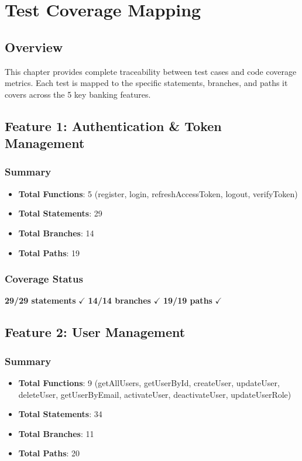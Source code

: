 \chapter{Test Coverage Mapping}

\section{Overview}
This chapter provides complete traceability between test cases and code coverage metrics. Each test is mapped to the specific statements, branches, and paths it covers across the 5 key banking features.

\section{Feature 1: Authentication \& Token Management}

\subsection{Summary}
\begin{itemize}
    \item \textbf{Total Functions}: 5 (register, login, refreshAccessToken, logout, verifyToken)
    \item \textbf{Total Statements}: 29
    \item \textbf{Total Branches}: 14
    \item \textbf{Total Paths}: 19
\end{itemize}

\subsection{Coverage Status}
\begin{center}
\textbf{29/29 statements} $\checkmark$ \quad \textbf{14/14 branches} $\checkmark$ \quad \textbf{19/19 paths} $\checkmark$
\end{center}

\section{Feature 2: User Management}

\subsection{Summary}
\begin{itemize}
    \item \textbf{Total Functions}: 9 (getAllUsers, getUserById, createUser, updateUser, deleteUser, getUserByEmail, activateUser, deactivateUser, updateUserRole)
    \item \textbf{Total Statements}: 34
    \item \textbf{Total Branches}: 11
    \item \textbf{Total Paths}: 20
\end{itemize}

